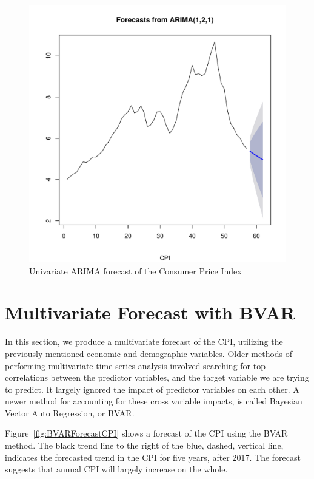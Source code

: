 \documentclass[12pt]{article}         %
\begin{document}
\begin{figure}[!ht]
\begin{center}
\includegraphics[width=\linewidth]{plots/CPI_arima.pdf}
\caption{Univariate ARIMA forecast of the Consumer Price Index}
\label{fig:ArimaCPI}
\end{center}
\end{figure}


\section{Multivariate Forecast with BVAR}

In this section, we produce a multivariate forecast of the CPI, utilizing the previously mentioned economic and demographic variables.  Older methods of performing multivariate time series analysis involved searching for top correlations between the predictor variables, and the target variable we are trying to predict.  It largely ignored the impact of predictor variables on each other.  A newer method for accounting for these cross variable impacts, is called Bayesian Vector Auto Regression, or BVAR.

Figure~\ref{fig:BVARForecastCPI} shows a forecast of the CPI using the BVAR method.  The black trend line to the right of the blue, dashed, vertical line, indicates the forecasted trend in the CPI for five years, after 2017.  The forecast suggests that annual CPI will largely increase on the whole.
\end{document}
